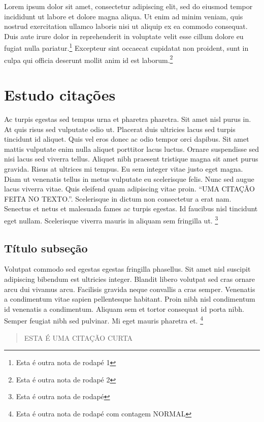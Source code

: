 \documentclass[12pt]{article}
\begin{document}
				Lorem ipsum dolor sit amet, consectetur adipiscing elit, sed do eiusmod tempor incididunt ut labore et dolore magna aliqua. Ut enim ad minim veniam, quis nostrud exercitation ullamco laboris nisi ut aliquip ex ea commodo consequat. Duis aute irure dolor in reprehenderit in voluptate velit esse cillum dolore eu fugiat nulla pariatur.\footnote{Esta é outra nota de rodapé 1} Excepteur sint occaecat cupidatat non proident, sunt in culpa qui officia deserunt mollit anim id est laborum.\footnote{Esta é outra nota de rodapé 2}
			
		\newpage
		
	\section{Estudo citações}
		Ac turpis egestas sed tempus urna et pharetra pharetra. Sit amet nisl purus in. At quis risus sed vulputate odio ut. Placerat duis ultricies lacus sed turpis tincidunt id aliquet. Quis vel eros donec ac odio tempor orci dapibus. Sit amet mattis vulputate enim nulla aliquet porttitor lacus luctus. Ornare suspendisse sed nisi lacus sed viverra tellus. Aliquet nibh praesent tristique magna sit amet purus gravida. Risus at ultrices mi tempus. Eu sem integer vitae justo eget magna. Diam ut venenatis tellus in metus vulputate eu scelerisque felis. Nunc sed augue lacus viverra vitae. Quis eleifend quam adipiscing vitae proin. \enquote{UMA CITAÇÃO FEITA NO TEXTO.}. Scelerisque in dictum non consectetur a erat nam. Senectus et netus et malesuada fames ac turpis egestas. Id faucibus nisl tincidunt eget nullam. Scelerisque viverra mauris in aliquam sem fringilla ut. \footnote{Esta é outra nota de rodapé}
		
		\subsection{Título subseção}
			Volutpat commodo sed egestas egestas fringilla phasellus. Sit amet nisl suscipit adipiscing bibendum est ultricies integer. Blandit libero volutpat sed cras ornare arcu dui vivamus arcu. Facilisis gravida neque convallis a cras semper. Venenatis a condimentum vitae sapien pellentesque habitant. Proin nibh nisl condimentum id venenatis a condimentum. Aliquam sem et tortor consequat id porta nibh. Semper feugiat nibh sed pulvinar. Mi eget mauris pharetra et. \footnote{Esta é outra nota de rodapé com contagem NORMAL}
			
			\begin{quote}
				ESTA É UMA CITAÇÃO CURTA
			\end{quote}
			
\end{document}

